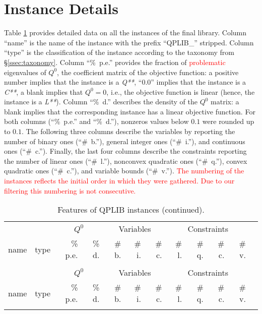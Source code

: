 
\section{Instance Details}\label{sec:instance_details}


Table \ref{tab:A1} provides detailed data on all the instances of the final library.
Column ``name'' is the name of the instance with the prefix ``QPLIB\_'' stripped.
Column ``type'' is the classification of the instance according to the taxonomy from \S\ref{ssec:taxonomy}.
Column ``\%~p.e.'' provides the fraction of \textcolor{red}{problematic} eigenvalues of $Q^0$, the coefficient matrix of the objective function: a positive number implies that the instance is a \textit{Q**}, ``0.0'' implies that the instance is a \textit{C**}, a blank implies that $Q^0 = 0$, i.e., the objective function is linear (hence, the instance is a \textit{L**}).
Column ``\%~d.'' describes the density of the $Q^0$ matrix: a blank implies that the corresponding instance has a linear objective function.
For both columns (``\%~p.e.'' and ``\%~d.''), nonzeros values below $0.1$ were rounded up to $0.1$.
The following three columns describe the variables by reporting the number of binary ones (``\#~b.''), general integer ones (``\#~i.''), and continuous ones (``\#~c.''). Finally, the last four columns describe the constraints reporting the number of linear ones (``\#~l.''), nonconvex quadratic ones (``\#~q.''), convex quadratic ones (``\#~c.''), and variable bounds (``\#~v.'').
\textcolor{red}{The numbering of the instances reflects the initial order in which they were gathered. Due to our filtering this numbering is not consecutive.}


{\tiny
\begin{longtable}[c]{llrrrrrrrrrr}
\caption{Features of QPLIB instances.} \\
\toprule
& & \multicolumn{2}{c}{$Q^0$} & \multicolumn{3}{c}{Variables} & \multicolumn{4}{c}{Constraints} \\
\cmidrule(lr){3-4} \cmidrule(lr){5-7} \cmidrule(lr){8-11}
name & type & \% p.e. & \% d. & \# b. & \# i. & \# c. & \# l. & \# q. & \# c. & \# v. \\
\midrule
\endfirsthead

\caption{Features of QPLIB instances (continued).} \\
\toprule
& & \multicolumn{2}{c}{$Q^0$} & \multicolumn{3}{c}{Variables} & \multicolumn{4}{c}{Constraints} \\
\cmidrule(lr){3-4} \cmidrule(lr){5-7} \cmidrule(lr){8-11}
name & type & \% p.e. & \% d. & \# b. & \# i. & \# c. & \# l. & \# q. & \# c. & \# v. \\
\midrule
\endhead



\bottomrule
\label{tab:A1}
\end{longtable}
}




